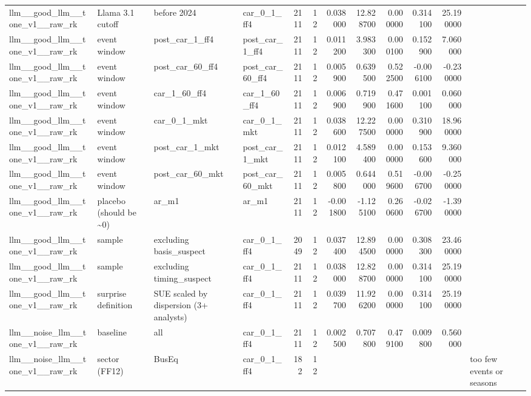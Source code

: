 \begin{table}
\begin{tabular}{llllrrrrrrrl}
llm\_\_good\_llm\_\_tone\_v1\_\_raw\_rk & Llama 3.1 cutoff & before 2024 & car\_0\_1\_ff4 & 2111 & 12 & 0.038000 & 12.828700 & 0.000000 & 0.314100 & 25.190000 &  \\
llm\_\_good\_llm\_\_tone\_v1\_\_raw\_rk & event window & post\_car\_1\_ff4 & post\_car\_1\_ff4 & 2111 & 12 & 0.011200 & 3.983300 & 0.000100 & 0.152900 & 7.060000 &  \\
llm\_\_good\_llm\_\_tone\_v1\_\_raw\_rk & event window & post\_car\_60\_ff4 & post\_car\_60\_ff4 & 2111 & 12 & 0.005900 & 0.639500 & 0.522500 & -0.006100 & -0.230000 &  \\
llm\_\_good\_llm\_\_tone\_v1\_\_raw\_rk & event window & car\_1\_60\_ff4 & car\_1\_60\_ff4 & 2111 & 12 & 0.006900 & 0.719900 & 0.471600 & 0.001100 & 0.060000 &  \\
llm\_\_good\_llm\_\_tone\_v1\_\_raw\_rk & event window & car\_0\_1\_mkt & car\_0\_1\_mkt & 2111 & 12 & 0.038600 & 12.227500 & 0.000000 & 0.310900 & 18.960000 &  \\
llm\_\_good\_llm\_\_tone\_v1\_\_raw\_rk & event window & post\_car\_1\_mkt & post\_car\_1\_mkt & 2111 & 12 & 0.012100 & 4.589400 & 0.000000 & 0.153600 & 9.360000 &  \\
llm\_\_good\_llm\_\_tone\_v1\_\_raw\_rk & event window & post\_car\_60\_mkt & post\_car\_60\_mkt & 2111 & 12 & 0.005800 & 0.644000 & 0.519600 & -0.006700 & -0.250000 &  \\
llm\_\_good\_llm\_\_tone\_v1\_\_raw\_rk & placebo (should be \textasciitilde 0) & ar\_m1 & ar\_m1 & 2111 & 12 & -0.001800 & -1.125100 & 0.260600 & -0.026700 & -1.390000 &  \\
llm\_\_good\_llm\_\_tone\_v1\_\_raw\_rk & sample & excluding basis\_suspect & car\_0\_1\_ff4 & 2049 & 12 & 0.037400 & 12.894500 & 0.000000 & 0.308300 & 23.460000 &  \\
llm\_\_good\_llm\_\_tone\_v1\_\_raw\_rk & sample & excluding timing\_suspect & car\_0\_1\_ff4 & 2111 & 12 & 0.038000 & 12.828700 & 0.000000 & 0.314100 & 25.190000 &  \\
llm\_\_good\_llm\_\_tone\_v1\_\_raw\_rk & surprise definition & SUE scaled by dispersion (3+ analysts) & car\_0\_1\_ff4 & 2111 & 12 & 0.039700 & 11.926200 & 0.000000 & 0.314100 & 25.190000 &  \\
llm\_\_noise\_llm\_\_tone\_v1\_\_raw\_rk & baseline & all & car\_0\_1\_ff4 & 2111 & 12 & 0.002500 & 0.707800 & 0.479100 & 0.009800 & 0.560000 &  \\
llm\_\_noise\_llm\_\_tone\_v1\_\_raw\_rk & sector (FF12) & BusEq & car\_0\_1\_ff4 & 182 & 12 &  &  &  &  &  & too few events or seasons \\

\end{tabular}
\end{table}
